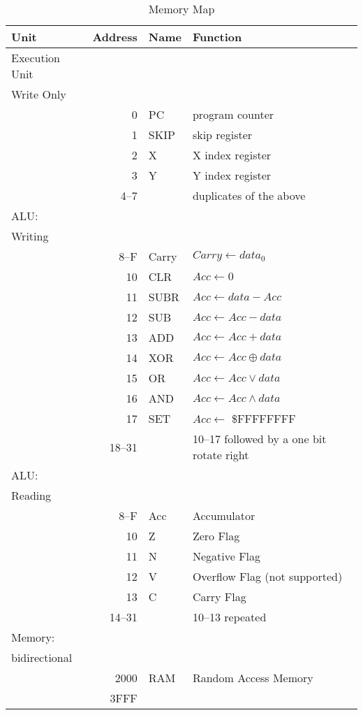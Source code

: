 \begin{table}
\centering
\begin{tabular}{||lrll||}
\hline
\hline

Unit & Address	&	Name & 	 Function\\
\hline
Execution Unit  & & &\\
Write Only &  & &\\
& 0	 & PC		& program counter \\
& 1	  & SKIP	& skip register\\
& 2	 & X		& X index register \\
& 3	 & Y		& Y index register\\
& 4--7 & & duplicates of the above\\
 \hline
ALU: & &  &\\
Writing & & &\\
& 8--F	 & Carry & $Carry \leftarrow data_{0}$\\
& 10	 & CLR	& $Acc \leftarrow 0$\\
& 11	 & SUBR	& $Acc \leftarrow data - Acc$\\
& 12	 & SUB	& $Acc \leftarrow Acc - data$\\
& 13	 & ADD 	& $Acc \leftarrow Acc + data$\\
& 14  	 & XOR  & $Acc \leftarrow Acc \oplus data$\\
& 15	 & OR 	& $Acc \leftarrow Acc \vee data$\\
& 16	 & AND	& $Acc \leftarrow Acc \wedge data$\\
& 17	 & SET 	& $Acc \leftarrow$ \$FFFFFFFF\\
& 18--31 &  	& 10--17 followed by  a  one bit rotate right\\
\hline
ALU: & & &\\
Reading & & &\\
& 8--F  & Acc & Accumulator\\
& 10 & Z & Zero Flag\\
& 11 & N & Negative Flag\\
& 12 & V & Overflow Flag (not supported)\\
& 13 & C & Carry Flag\\
& 14--31 & & 10--13 repeated\\
\hline
Memory: & & &\\
bidirectional & & &\\
& 2000  & RAM		& Random Access Memory\\
& 3FFF &   &\\
\hline
\hline
\end{tabular}

\caption{Memory Map}
\label{table:memory}
\end{table}


